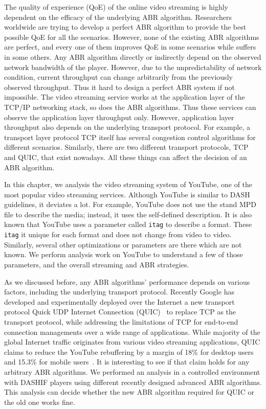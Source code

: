 
The quality of experience (QoE) of the online video streaming is highly dependent on the efficacy of the underlying ABR algorithm. Researchers worldwide are trying to develop a perfect ABR algorithm to provide the best possible QoE for all the scenarios. However, none of the existing ABR algorithms are perfect, and every one of them improves QoE in some scenarios while suffers in some others. Any ABR algorithm directly or indirectly depend on the observed network bandwidth of the player. However, due to the unpredictability of network condition, current throughput can change arbitrarily from the previously observed throughput. Thus it hard to design a perfect ABR system if not impossible. The video streaming service works at the application layer of the TCP/IP networking stack, so does the ABR algorithms. Thus these services can observe the application layer throughput only. However, application layer throughput also depends on the underlying transport protocol. For example, a transport layer protocol TCP itself has several congestion control algorithms for different scenarios. Similarly, there are two different transport protocols, TCP and QUIC, that exist nowadays. All these things can affect the decision of an ABR algorithm.

In this chapter, we analysis the video streaming system of YouTube, one of the most popular video streaming services. Although YouTube is similar to DASH guidelines, it deviates a lot. For example, YouTube does not use the stand MPD file to describe the media; instead, it uses the self-defined description. It is also known that YouTube uses a parameter called {\tt itag} to describe a format. These {\tt itag} it unique for each format and does not change from video to video. Similarly, several other optimizations or parameters are there which are not known. We perform analysis work on YouTube to understand a few of those parameters, and the overall streaming and ABR strategies.

As we discussed before, any ABR algorithms' performance depends on various factors, including the underlying transport protocol. 
Recently Google has developed and experimentally deployed over the Internet a new transport protocol Quick UDP Internet Connection (QUIC)~\cite{langley2017quic} to replace TCP as the transport protocol, while addressing the limitations of TCP for end-to-end connection managements over a wide range of applications. While majority of the global Internet traffic originates from various video streaming applications, QUIC claims to reduce the YouTube rebuffering by a margin of 18\% for desktop users and 15.3\% for mobile users~\cite{langley2017quic}.  It is interesting to see if that claim holds for any arbitrary ABR algorithms. We performed an analysis in a controlled environment with DASHIF players using different recently designed advanced ABR algorithms. This analysis can decide whether the new ABR algorithm required for QUIC or the old one works fine.


